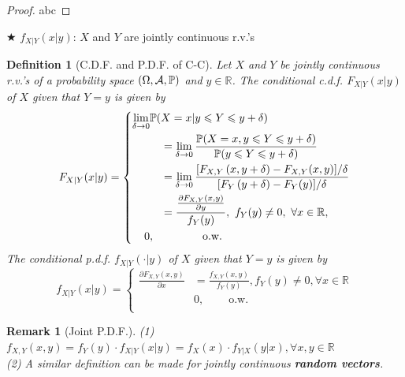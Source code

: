 \documentclass[openany,12pt]{book}
\newtheorem{remark}{Remark}[chapter]
\newtheorem{definition}{Definition}[chapter]
\begin{document}
\begin{proof}
  abc
\end{proof}

$\bigstar$ $f_{X|Y}(x|y)$: $X$ and $Y$ are jointly continuous r.v.'s

\begin{definition}[C.D.F. and P.D.F. of C-C]
  Let $X$ and $Y$ be jointly continuous r.v.'s of a probability
  space $(\Omega,\mathcal{A},\mathbb{P})$ and $y \in \mathbb{R}$. The conditional c.d.f. $F_{X|Y}(x|y)$ of $X$ given that $Y = y$ is given by
  \[
    F_{X|Y}(x|y)= \left\{ \begin{aligned}
      \lim_{\delta \to 0} & {\mathbb{P}( X = x | y \leqslant Y \leqslant y + \delta)} \\
      & \quad= \lim_{\delta \to 0}\frac{\mathbb{P}( X = x,y \leqslant Y \leqslant y + \delta)}{\mathbb{P}( y \leqslant Y \leqslant y + \delta)} \\
      & \quad= \lim_{\delta \to 0}\frac{[ F_{X,Y}\left( x,y + \delta \right) - F_{X,Y}(x,y)]/\delta}{[ F_{Y}\left( y + \delta \right) - F_{Y}(y)]/\delta} \\
      & \quad= \frac{\frac{\partial F_{X,Y}(x,y)}{\partial y}}{f_{Y}(y)},~f_{Y}(y) \neq 0,~\forall x \in \mathbb{R}, \\
    0                   & , \qquad\qquad~\text{o.w.}~ \\
    \end{aligned} \right. \]
  The conditional p.d.f. $f_{X|Y}\left( \cdot | y \right)$ of $X$ given that $Y = y$ is given by
  \[
    f_{X|Y}(x|y)= \left\{ \begin{aligned}
      \frac{\partial F_{X,Y}(x,y)}{\partial x} & = \frac{f_{X,Y}(x,y)}{f_{Y}(y)},f_{Y}(y) \neq 0,\forall x \in \mathbb{R} \\
      & 0,\qquad~\text{o.w.}~ \\
    \end{aligned} \right.
  \]
\end{definition}

\begin{remark}[Joint P.D.F.]
  (1) $f_{X,Y}(x,y)= f_{Y}(y) \cdot f_{X|Y}(x|y)= f_{X}(x) \cdot f_{Y|X}(y|x), \forall x,y \in \mathbb{R}$\\
  (2) A similar definition can be made for jointly continuous \textbf{random vectors}.
\end{remark}
\end{document}
